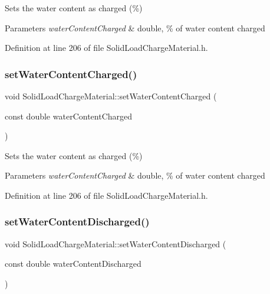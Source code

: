 Sets the water content as charged (\%) 
\begin{DoxyParams}{Parameters}
{\em water\+Content\+Charged} & double, \% of water content charged \\
\hline
\end{DoxyParams}


Definition at line 206 of file Solid\+Load\+Charge\+Material.\+h.

\mbox{\label{class_solid_load_charge_material_abf43422318a1b9120dff1dcfb15d5265}} 
\subsubsection{\texorpdfstring{set\+Water\+Content\+Charged()}{setWaterContentCharged()}\hspace{0.1cm}{\footnotesize\ttfamily [3/3]}}
{\footnotesize\ttfamily void Solid\+Load\+Charge\+Material\+::set\+Water\+Content\+Charged (\begin{DoxyParamCaption}\item[{const double}]{water\+Content\+Charged }\end{DoxyParamCaption})\hspace{0.3cm}{\ttfamily [inline]}}

Sets the water content as charged (\%) 
\begin{DoxyParams}{Parameters}
{\em water\+Content\+Charged} & double, \% of water content charged \\
\hline
\end{DoxyParams}


Definition at line 206 of file Solid\+Load\+Charge\+Material.\+h.

\mbox{\label{class_solid_load_charge_material_a5104ddb43af977a751b90a0bc844d83d}} 
\subsubsection{\texorpdfstring{set\+Water\+Content\+Discharged()}{setWaterContentDischarged()}\hspace{0.1cm}{\footnotesize\ttfamily [1/3]}}
{\footnotesize\ttfamily void Solid\+Load\+Charge\+Material\+::set\+Water\+Content\+Discharged (\begin{DoxyParamCaption}\item[{const double}]{water\+Content\+Discharged }\end{DoxyParamCaption})\hspace{0.3cm}{\ttfamily [inline]}}

